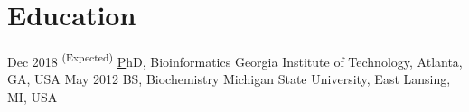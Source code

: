 \documentclass[letterpaper]{twentysecondcv}
\begin{document}
\makeprofile %

\section{Education}

\begin{twenty} %
	\twentyitem
    	{Dec 2018}
        {\textsuperscript{(Expected)}}
        {\href{http://http://bioinformatics.gatech.edu/phd-curriculum/}PhD, Bioinformatics}
        {{Georgia Institute of Technology, Atlanta, GA, USA}}
        {}
        {}
	\twentyitem
    	{May 2012}
		{}
        {BS, Biochemistry}
        {{Michigan State University, East Lansing, MI, USA}}
        {}
        {}
\end{twenty}
\end{document}

